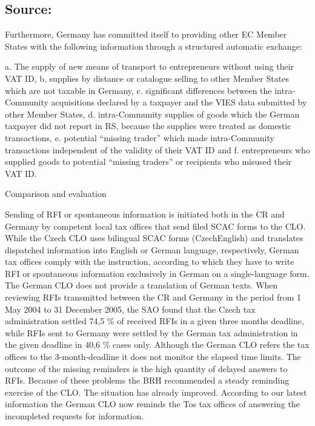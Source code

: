 \documentclass[10pt]{article}
\begin{document}
\subsection*{Source:}



Furthermore, Germany has committed itself to providing other EC Member States with the following information through a structured automatic exchange:

a. The supply of new means of transport to entrepreneurs without using their VAT ID, b. supplies by distance or catalogue selling to other Member States which are not taxable in Germany, c. significant differences between the intra-Community acquisitions declared by a taxpayer and the VIES data submitted by other Member States, d. intra-Community supplies of goods which the German taxpayer did not report in RS, because the supplies were treated as domestic transactions, e. potential “missing trader” which made intra-Community transactions independent of the validity of their VAT ID and f. entrepreneurs who supplied goods to potential “missing traders” or recipients who misused their VAT ID.


Comparison and evaluation

Sending of RFI or spontaneous information is initiated both in the CR and Germany by competent local tax offices that send filed SCAC forms to the CLO.
While the Czech CLO uses bilingual SCAC forms (CzechEnglish) and translates dispatched information into English or German language, respectively, German tax offices comply with the instruction, according to which they have to write RFI or spontaneous information exclusively in German on a single-language form.
The German CLO does not provide a translation of German texts.
When reviewing RFIs transmitted between the CR and Germany in the period from 1 May 2004 to 31 December 2005, the SAO found that the Czech tax administration settled 74,5 \% of received RFIs in a given three months deadline, while RFIs sent to Germany were settled by the German tax administration in the given deadline in 40,6 \% cases only.
Although the German CLO refers the tax offices to the 3-month-deadline it does not monitor the elapsed time limits.
The outcome of the missing reminders is the high quantity of delayed answers to RFIs.
Because of these problems the BRH recommended a steady reminding exercise of the CLO.
The situation has already improved.
According to our latest information the German CLO now reminds the Tos tax offices of answering the incompleted requests for information.
\end{document}
